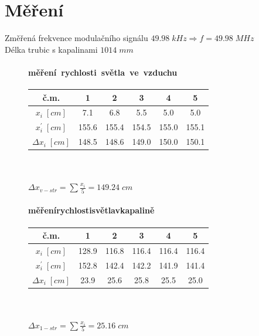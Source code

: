 \documentclass{article}
\begin{document}
\section{Měření}
Změřená frekvence modulačního signálu \(49.98\;kHz\Rightarrow f=49.98\;MHz\) \\
Délka trubic s kapalinami             \(1014\;mm\)
\begin{figure}[H]
	\begin{minipage}[t]{0.35\textwidth}
        \paragraph*{měření~rychlosti~světla~ve~vzduchu}
        \begin{tabular}{|c|c|c|c|c|c|}
            \hline
            č.\;m.                      & 1     & 2     & 3     & 4     & 5     \\ \hline
            \(x_i\;[cm]\)               & 7.1   & 6.8   & 5.5   & 5.0   & 5.0   \\ \hline
            \(x_{i}^{\prime}\;[cm]\)    & 155.6 & 155.4 & 154.5 & 155.0 & 155.1 \\ \hline
            \(\Delta x_{i}\;[cm]\)      & 148.5 & 148.6 & 149.0 & 150.0 & 150.1 \\ \hline
        \end{tabular}
        \\ \\
        \(\Delta x_{v-str}=\sum \frac{x_{i}}{5}=149.24\;cm\)
    \end{minipage}
    \hfill
	\begin{minipage}[t]{0.5\textwidth}
        \paragraph*{měření\;rychlosti\;světla\;v\;kapalině}
        \begin{tabular}{|c|c|c|c|c|c|}
            \hline
            č.\;m.                      & 1     & 2     & 3     & 4     & 5     \\ \hline
            \(x_i\;[cm]\)               & 128.9 & 116.8 & 116.4 & 116.4 & 116.4 \\ \hline
            \(x_{i}^{\prime}\;[cm]\)    & 152.8 & 142.4 & 142.2 & 141.9 & 141.4 \\ \hline
            \(\Delta x_{i}\;[cm]\)      & 23.9  & 25.6  & 25.8  & 25.5  & 25.0  \\ \hline
        \end{tabular}
        \\ \\
        \(\Delta x_{1-str}=\sum \frac{x_{i}}{5}=25.16\;cm\)
    \end{minipage}
\end{figure}
\end{document}
